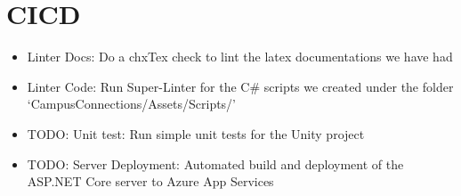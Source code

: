 \documentclass{article}
\begin{document}
\section{CICD}
\begin{itemize}
    \item Linter Docs: Do a chxTex check to lint the latex documentations we have had
    \item Linter Code: Run Super-Linter for the C\# scripts we created under the folder `CampusConnections/Assets/Scripts/'
    \item TODO: Unit test: Run simple unit tests for the Unity project
    \item TODO: Server Deployment: Automated build and deployment of the ASP.NET Core server to Azure App Services
\end{itemize}
\end{document}
